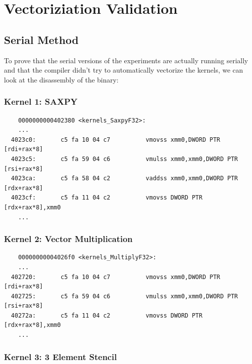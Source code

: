 \documentclass[11pt]{article}
\begin{document}
\section{Vectoriziation Validation}

\subsection{Serial Method}

To prove that the serial versions of the experiments are actually running serially and that the compiler didn't try to
automatically vectorize the kernels, we can look at the disassembly of the binary:

\subsubsection{Kernel 1: SAXPY}

\begin{verbatim}
	0000000000402380 <kernels_SaxpyF32>:
	...
  4023c0:       c5 fa 10 04 c7          vmovss xmm0,DWORD PTR [rdi+rax*8]
  4023c5:       c5 fa 59 04 c6          vmulss xmm0,xmm0,DWORD PTR [rsi+rax*8]
  4023ca:       c5 fa 58 04 c2          vaddss xmm0,xmm0,DWORD PTR [rdx+rax*8]
  4023cf:       c5 fa 11 04 c2          vmovss DWORD PTR [rdx+rax*8],xmm0
	...
\end{verbatim}

\subsubsection{Kernel 2: Vector Multiplication}

\begin{verbatim}
	00000000004026f0 <kernels_MultiplyF32>:
	...
  402720:       c5 fa 10 04 c7          vmovss xmm0,DWORD PTR [rdi+rax*8]
  402725:       c5 fa 59 04 c6          vmulss xmm0,xmm0,DWORD PTR [rsi+rax*8]
  40272a:       c5 fa 11 04 c2          vmovss DWORD PTR [rdx+rax*8],xmm0
	...

\end{verbatim}

\subsubsection{Kernel 3: 3 Element Stencil}
\end{document}
